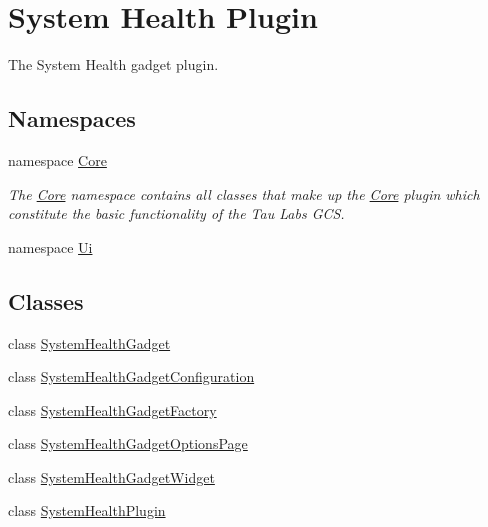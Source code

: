\hypertarget{group___system_health_plugin}{\section{System Health Plugin}
\label{group___system_health_plugin}
}


The System Health gadget plugin.  


\subsection*{Namespaces}
\begin{DoxyCompactItemize}
\item 
namespace \hyperlink{namespace_core}{Core}
\begin{DoxyCompactList}\small\item\em The \hyperlink{namespace_core}{Core} namespace contains all classes that make up the \hyperlink{namespace_core}{Core} plugin which constitute the basic functionality of the Tau Labs G\-C\-S. \end{DoxyCompactList}\item 
namespace \hyperlink{namespace_ui}{Ui}
\end{DoxyCompactItemize}
\subsection*{Classes}
\begin{DoxyCompactItemize}
\item 
class \hyperlink{class_system_health_gadget}{System\-Health\-Gadget}
\item 
class \hyperlink{class_system_health_gadget_configuration}{System\-Health\-Gadget\-Configuration}
\item 
class \hyperlink{class_system_health_gadget_factory}{System\-Health\-Gadget\-Factory}
\item 
class \hyperlink{class_system_health_gadget_options_page}{System\-Health\-Gadget\-Options\-Page}
\item 
class \hyperlink{class_system_health_gadget_widget}{System\-Health\-Gadget\-Widget}
\item 
class \hyperlink{class_system_health_plugin}{System\-Health\-Plugin}
\end{DoxyCompactItemize}
